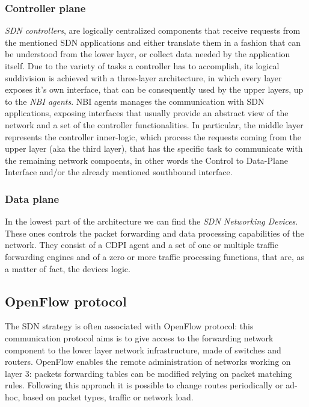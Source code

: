 \subsubsection{Controller plane}

\emph{SDN controllers}, are logically centralized components that
receive requests from the mentioned SDN applications and either translate them 
in a fashion that can be understood from the lower layer, or collect 
data needed by the application itself. 
Due to the variety of tasks a controller has to accomplish, its logical 
suddivision is achieved with a three-layer architecture, in which every layer 
exposes it's own interface, that can be consequently used by the upper 
layers, up to the \emph{NBI agents}.
NBI agents manages the communication with SDN applications, exposing interfaces
that usually provide an abstract view of the network and a set of
the controller functionalities.
In particular, the middle layer represents the controller inner-logic, which 
process the requests coming from the upper layer (aka the third layer), that 
has the specific task to communicate with the remaining network compoents, in 
other words the Control to Data-Plane Interface and/or the already 
mentioned southbound interface.

\subsubsection{Data plane}

In the lowest part of the architecture we can find the \emph{SDN Networking 
Devices}. These ones controls the packet forwarding and data processing 
capabilities of the network. They consist of a CDPI agent and a set of one or 
multiple traffic forwarding engines and of a zero or more traffic processing 
functions, that are, as a matter of fact, the devices logic.

\subsection{OpenFlow protocol}
The SDN strategy is often associated with OpenFlow protocol: this communication
protocol aims is to give access to the forwarding network component to the lower
layer network infrastructure, made of switches and routers. OpenFlow enables
the remote administration of networks working on layer 3: packets forwarding
tables can be modified relying on packet matching rules. Following this
approach it is possible to change routes periodically or ad-hoc, based on
packet types, traffic or network load.

